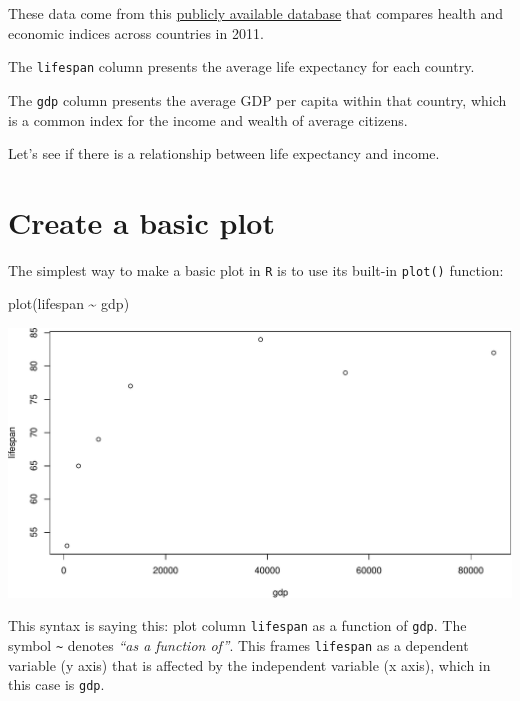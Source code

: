 \documentclass[
]{book}
\newenvironment{Shaded}{\begin{snugshade}}{\end{snugshade}}
\newcommand{\FunctionTok}[1]{\textcolor[rgb]{0.00,0.00,0.00}{#1}}
\newcommand{\NormalTok}[1]{#1}
\newcommand{\SpecialCharTok}[1]{\textcolor[rgb]{0.00,0.00,0.00}{#1}}
\begin{document}
These data come from this \href{https://datasets.iisg.amsterdam/dataset.xhtml?persistentId=hdl:10622/LKYT53}{publicly available database} that compares health and economic indices across countries in 2011.

The \texttt{lifespan} column presents the average life expectancy for each country.

The \texttt{gdp} column presents the average GDP per capita within that country, which is a common index for the income and wealth of average citizens.

Let's see if there is a relationship between life expectancy and income.

\hypertarget{create-a-basic-plot}{%
\section*{Create a basic plot}\label{create-a-basic-plot}}

The simplest way to make a basic plot in \texttt{R} is to use its built-in \texttt{plot()} function:

\begin{Shaded}
\begin{Highlighting}[]
\FunctionTok{plot}\NormalTok{(lifespan }\SpecialCharTok{\textasciitilde{}}\NormalTok{ gdp)}
\end{Highlighting}
\end{Shaded}

\includegraphics{figures/unnamed-chunk-95-1.pdf}

This syntax is saying this: plot column \texttt{lifespan} as a function of \texttt{gdp}. The symbol \texttt{\textasciitilde{}} denotes \emph{``as a function of''}. This frames \texttt{lifespan} as a dependent variable (y axis) that is affected by the independent variable (x axis), which in this case is \texttt{gdp}.
\end{document}
